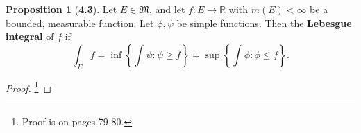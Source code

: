 \documentclass[12pt]{article}
\newcommand{\R}{\mathbb{R}}
\theoremstyle{definition}
\newtheorem*{prop}{Proposition}
\begin{document}
\begin{prop}[\textbf{4.3}]
    Let \( E \in \mathfrak{M} \), and let \( f: E \to \R \) with \( m(E) < \infty \) be a bounded, measurable function. Let \( \phi, \psi \) be simple functions. Then the \textbf{Lebesgue integral} of \( f \) if
        \[
            \int_{E} f = \inf \left\{ \int \psi: \psi \geq f \right\} = \sup \left\{ \int \phi : \phi \leq f \right\}.  
        \] 

        \begin{proof}\footnote{Proof is on pages 79-80.}
            
        \end{proof}
\end{prop}
\end{document}
